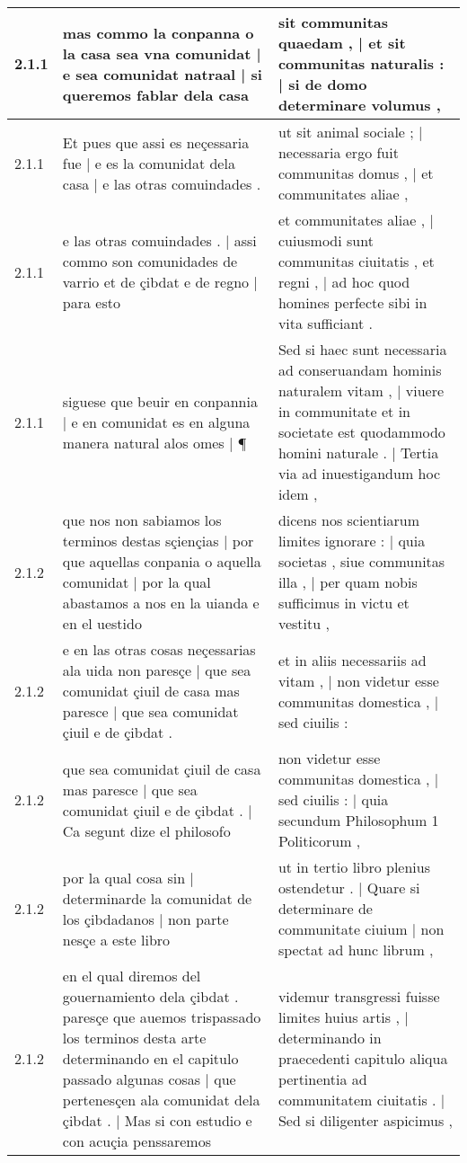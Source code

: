 \begin{tabular}{|p{1cm}|p{6.5cm}|p{6.5cm}|}
2.1.1 & mas commo la conpanna o la casa sea vna comunidat | e sea comunidat natraal | si queremos fablar dela casa & sit communitas quaedam , | et sit communitas naturalis : | si de domo determinare volumus , \\\hline
2.1.1 & Et pues que assi es neçessaria fue | e es la comunidat dela casa | e las otras comuindades . & ut sit animal sociale ; | necessaria ergo fuit communitas domus , | et communitates aliae , \\\hline
2.1.1 & e las otras comuindades . | assi commo son comunidades de varrio et de çibdat e de regno | para esto & et communitates aliae , | cuiusmodi sunt communitas ciuitatis , et regni , | ad hoc quod homines perfecte sibi in vita sufficiant . \\\hline
2.1.1 & siguese que beuir en conpannia | e en comunidat es en alguna manera natural alos omes | ¶ & Sed si haec sunt necessaria ad conseruandam hominis naturalem vitam , | viuere in communitate et in societate est quodammodo homini naturale . | Tertia via ad inuestigandum hoc idem , \\\hline
2.1.2 & que nos non sabiamos los terminos destas sçiençias | por que aquellas conpania o aquella comunidat | por la qual abastamos a nos en la uianda e en el uestido & dicens nos scientiarum limites ignorare : | quia societas , siue communitas illa , | per quam nobis sufficimus in victu et vestitu , \\\hline
2.1.2 & e en las otras cosas neçessarias ala uida non paresçe | que sea comunidat çiuil de casa mas paresce | que sea comunidat çiuil e de çibdat . & et in aliis necessariis ad vitam , | non videtur esse communitas domestica , | sed ciuilis : \\\hline
2.1.2 & que sea comunidat çiuil de casa mas paresce | que sea comunidat çiuil e de çibdat . | Ca segunt dize el philosofo & non videtur esse communitas domestica , | sed ciuilis : | quia secundum Philosophum 1 Politicorum , \\\hline
2.1.2 & por la qual cosa sin | determinarde la comunidat de los çibdadanos | non parte nesçe a este libro & ut in tertio libro plenius ostendetur . | Quare si determinare de communitate ciuium | non spectat ad hunc librum , \\\hline
2.1.2 & en el qual diremos del gouernamiento dela çibdat . paresçe que auemos trispassado los terminos desta arte determinando en el capitulo passado algunas cosas | que pertenesçen ala comunidat dela çibdat . | Mas si con estudio e con acuçia penssaremos & videmur transgressi fuisse limites huius artis , | determinando in praecedenti capitulo aliqua pertinentia ad communitatem ciuitatis . | Sed si diligenter aspicimus , \\\hline

\end{tabular}
